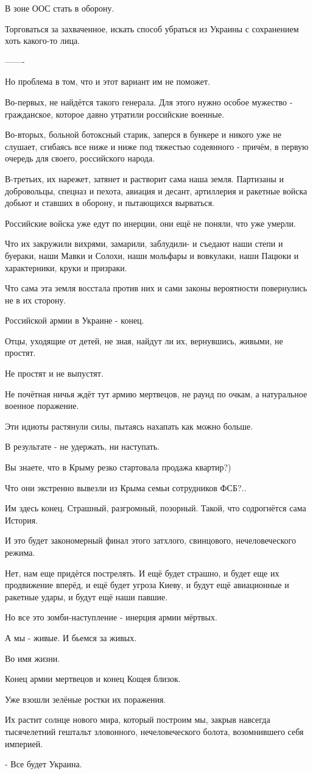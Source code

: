 В зоне ООС стать в оборону. 

Торговаться за захваченное, искать способ убраться из Украины с сохранением
хоть какого-то лица.

——-

Но проблема в том, что и этот вариант им не поможет.

Во-первых, не найдётся такого генерала. Для этого нужно особое мужество -
гражданское, которое давно утратили российские военные. 

Во-вторых, больной ботоксный старик, заперся в бункере и никого уже не слушает,
сгибаясь все ниже и ниже под тяжестью содеянного - причём, в первую очередь для
своего, российского народа. 

В-третьих, их нарежет, затянет и растворит сама наша земля. Партизаны и
добровольцы, спецназ и пехота, авиация и десант, артиллерия и ракетные войска
добьют и ставших в оборону, и пытающихся вырваться. 

Российские войска уже едут по инерции, они ещё не поняли, что уже умерли.

Что их закружили вихрями, замарили, заблудили-  и съедают наши степи и буераки,
наши Мавки и Солохи, наши мольфары и вовкулаки, наши Пацюки и характерники,
круки и призраки. 

Что сама эта земля восстала против них и сами законы вероятности повернулись не
в их сторону.

Российской армии в Украине - конец. 

Отцы, уходящие от детей, не зная, найдут ли их, вернувшись, живыми, не простят.

Не простят и не выпустят. 

Не почётная ничья ждёт тут армию мертвецов, не раунд по очкам, а натуральное
военное поражение.

Эти идиоты растянули силы, пытаясь нахапать как можно больше.

В результате - не удержать, ни наступать.

Вы знаете, что в Крыму резко стартовала продажа квартир?)

Что они экстренно вывезли из Крыма семьи сотрудников ФСБ?..

Им здесь конец. Страшный, разгромный, позорный. Такой, что содрогнётся сама
История.

И это будет закономерный финал этого затхлого, свинцового, нечеловеческого
режима.

Нет, нам еще придётся пострелять. И ещё  будет страшно, и будет еще их
продвижение вперёд, и ещё будет угроза Киеву, и будут ещё авиационные и
ракетные удары, и будут  ещё наши павшие.

Но все это зомби-наступление  - инерция армии мёртвых.

А мы - живые. И бьемся за живых.

Во имя жизни.

Конец армии мертвецов и конец Кощея близок.

Уже взошли зелёные ростки их поражения.

Их растит солнце нового мира, который построим мы, закрыв навсегда тысячелетний
гештальт зловонного, нечеловеческого болота, возомнившего себя империей. 

- Все будет Украина.
